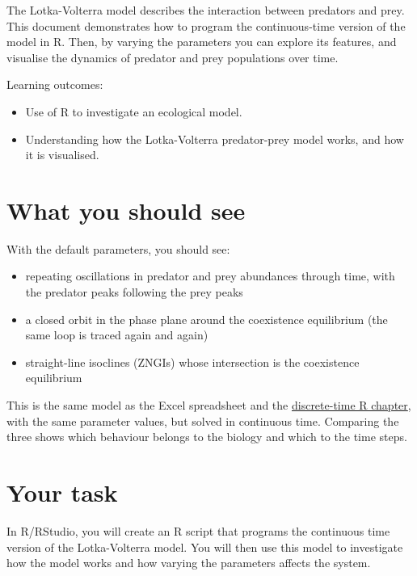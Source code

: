 \documentclass[
  a4paper]{book}
\providecommand{\tightlist}{%
  \setlength{\itemsep}{0pt}\setlength{\parskip}{0pt}}
\begin{document}
The Lotka-Volterra model describes the interaction between predators and prey. This document demonstrates how to program the continuous-time version of the model in R. Then, by varying the parameters you can explore its features, and visualise the dynamics of predator and prey populations over time.

Learning outcomes:

\begin{itemize}
\tightlist
\item
  Use of R to investigate an ecological model.
\item
  Understanding how the Lotka-Volterra predator-prey model works, and how it is visualised.
\end{itemize}

\section{What you should see}\label{what-you-should-see}

With the default parameters, you should see:

\begin{itemize}
\tightlist
\item
  repeating oscillations in predator and prey abundances through time, with the predator peaks following the prey peaks
\item
  a closed orbit in the phase plane around the coexistence equilibrium (the same loop is traced again and again)
\item
  straight-line isoclines (ZNGIs) whose intersection is the coexistence equilibrium
\end{itemize}

This is the same model as the Excel spreadsheet and the \href{discrete-time-lotka-volterra-predator-prey-model-in-r.html}{discrete-time R chapter}, with the same parameter values, but solved in continuous time. Comparing the three shows which behaviour belongs to the biology and which to the time steps.

\section{Your task}\label{your-task-19}

In R/RStudio, you will create an R script that programs the continuous time version of the Lotka-Volterra model. You will then use this model to investigate how the model works and how varying the parameters affects the system.
\end{document}

